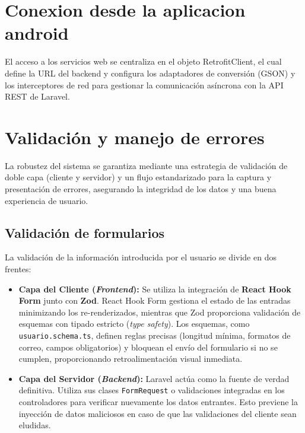 \documentclass[12pt,letterpaper]{report}
\begin{document}
	\section{Conexion desde la aplicacion android}
	
	El acceso a los servicios web se centraliza en el objeto RetrofitClient, el cual define la URL del backend y configura los adaptadores de conversión (GSON) y los interceptores de red para gestionar la comunicación asíncrona con la API REST de Laravel.
	
	\section{Validación y manejo de errores}
	
	La robustez del sistema se garantiza mediante una estrategia de validación de doble capa (cliente y servidor) y un flujo estandarizado para la captura y presentación de errores, asegurando la integridad de los datos y una buena experiencia de usuario.
	
	\subsection{Validación de formularios}
	La validación de la información introducida por el usuario se divide en dos frentes:
	\begin{itemize}
		\item \textbf{Capa del Cliente (\textit{Front\-end}):} Se utiliza la integración de \textbf{React Hook Form} junto con \textbf{Zod}. React Hook Form gestiona el estado de las entradas minimizando los re-renderizados, mientras que Zod proporciona validación de esquemas con tipado estricto (\textit{type safety}). Los esquemas, como \texttt{usuario.schema.ts}, definen reglas precisas (longitud mínima, formatos de correo, campos obligatorios) y bloquean el envío del formulario si no se cumplen, proporcionando retroalimentación visual inmediata.
		\item \textbf{Capa del Servidor (\textit{Back\-end}):} Laravel actúa como la fuente de verdad definitiva. Utiliza sus clases \texttt{FormRequest} o validaciones integradas en los controladores para verificar nuevamente los datos entrantes. Esto previene la inyección de datos maliciosos en caso de que las validaciones del cliente sean eludidas.
	\end{itemize}
	
\end{document}
